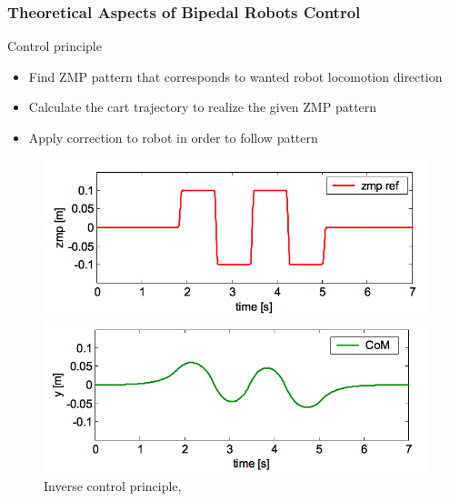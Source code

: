 \documentclass{beamer}
\begin{document}
\begin{frame}
	\frametitle{Theoretical Aspects of Bipedal Robots Control}
	\begin{block}{Control principle}
		\begin{itemize}
			\item
			Find ZMP pattern that corresponds to wanted robot locomotion direction
			\item
			Calculate the cart trajectory to realize the given ZMP pattern
			\item
			Apply correction to robot in order to follow pattern
		\end{itemize}
	\end{block}
	
	\begin{figure}[h!]
		\begin{minipage}[H]{\linewidth}
			\centering
			\includegraphics[width=0.35\linewidth]{presentation_images/13}
		\end{minipage}
		\begin{minipage}[H]{\linewidth}
			\centering
			\includegraphics[width=0.35\linewidth]{presentation_images/14}
		\end{minipage}
		\caption{Inverse control principle, \cite{kajita2003biped}}
	\end{figure}
\end{frame}

\end{document}
